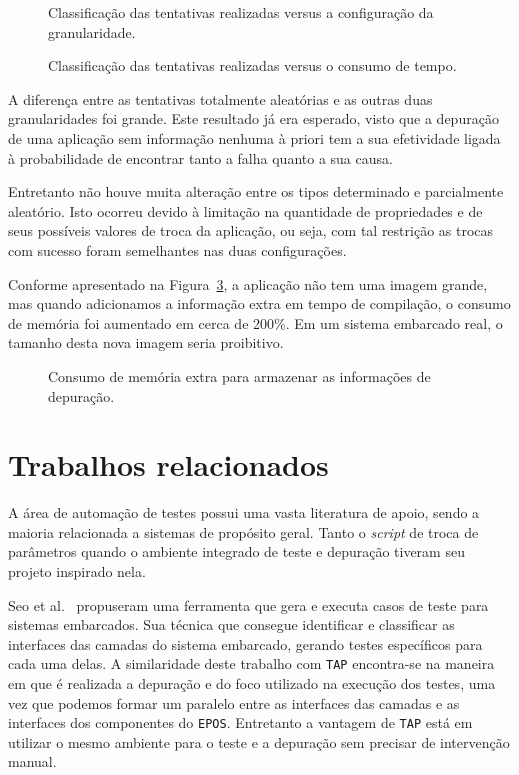 \documentclass[conference]{IEEEtran}
\newcommand{\fig}[4][h]{
  \begin{figure}[#1] {\centering{\texttt{[image: fig/\#2]}}\par}
    \caption{#3\label{fig:#2}}
  \end{figure}
}
\begin{document}
\fig{dmec_results}{Classificação das tentativas realizadas versus a configuração da granularidade.}{scale = 0.7}
\fig{dmec_time_results}{Classificação das tentativas realizadas versus o consumo de tempo.}{scale = 0.4}

A diferença entre as tentativas totalmente aleatórias e as outras duas granularidades foi grande. Este resultado já era esperado, visto que a depuração de uma aplicação sem informação nenhuma à priori tem a sua efetividade ligada à probabilidade de encontrar tanto a falha quanto a sua causa.

Entretanto não houve muita alteração entre os tipos determinado e parcialmente aleatório. Isto ocorreu devido à limitação na quantidade de propriedades e de seus possíveis valores de troca da aplicação, ou seja, com tal restrição as trocas com sucesso foram semelhantes nas duas configurações.

Conforme apresentado na Figura~\ref{fig:dmec_size_results}, a aplicação não tem uma imagem grande, mas quando adicionamos a informação extra em tempo de compilação, o consumo de memória foi aumentado em cerca de 200\%. Em um sistema embarcado real, o tamanho desta nova imagem seria proibitivo.

\fig{dmec_size_results}{Consumo de memória extra para armazenar as informações de depuração.}{scale = 0.7}


\section{Trabalhos relacionados}
\label{sec:relacionados}
A área de automação de testes possui uma vasta literatura de apoio, sendo a maioria relacionada a sistemas de propósito geral. Tanto o \textit{script} de troca de parâmetros quando o ambiente integrado de teste e depuração tiveram seu projeto inspirado nela.

Seo et al.~\cite{seo} propuseram uma ferramenta que gera e executa casos de teste para sistemas embarcados. Sua técnica que consegue identificar e classificar as interfaces das camadas do sistema embarcado, gerando testes específicos para cada uma delas. A similaridade deste trabalho com \texttt{TAP} encontra-se na maneira em que é realizada a depuração e do foco utilizado na execução dos testes, uma vez que podemos formar um paralelo entre as interfaces das camadas e as interfaces dos componentes do \texttt{EPOS}. Entretanto a vantagem de  \texttt{TAP} está em utilizar o mesmo ambiente para o teste e a depuração sem precisar de intervenção manual.
\end{document}

